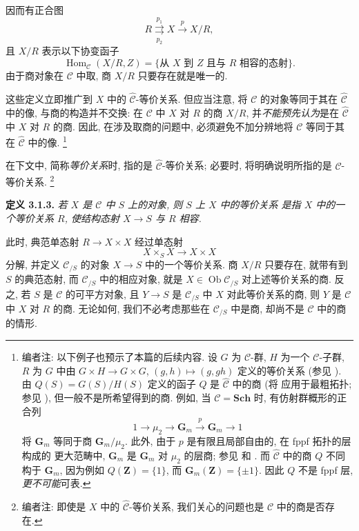 因而有正合图
\[
  R\overset{p_1}{\underset{p_2}{\rightrightarrows}}
  X\xrightarrow{p}X/R,
\]
且 \(X/R\) 表示以下协变函子
\[
  \operatorname{Hom}_{\mathscr C}(X/R,Z)
  =\{\text{从 \(X\) 到 \(Z\) 且与 \(R\) 相容的态射}\}.
\]
由于商对象在 \(\mathscr C\) 中取, 商 \(X/R\) 只要存在就是唯一的.

这些定义立即推广到 \(X\) 中的 \(\widehat{\mathscr C}\)-等价关系.
但应当注意, 将 \(\mathscr C\) 的对象等同于其在
\(\widehat{\mathscr C}\) 中的像, 与商的构造并不交换:
在 \(\mathscr C\) 中 \(X\) 对 \(R\) 的商 \(X/R\),
并\emph{不能预先认为}是在 \(\widehat{\mathscr C}\) 中
\(X\) 对 \(R\) 的商. 因此, 在涉及取商的问题中,
必须避免不加分辨地将 \(\mathscr C\) 等同于其在
\(\widehat{\mathscr C}\) 中的像.
\footnote{编者注: 以下例子也预示了本篇的后续内容.
设 \(G\) 为 \(\mathscr C\)-群, \(H\) 为一个
\(\mathscr C\)-子群, \(R\) 为 \(G\) 中由
\(G\times H\to G\times G\), \((g,h)\mapsto(g,gh)\)
定义的等价关系 (参见 ).
由 \(Q(S)=G(S)/H(S)\) 定义的函子 \(Q\) 是
\(\widehat{\mathscr C}\) 中的商
(将  应用于最粗拓扑;
参见 ),
但一般不是所希望得到的商. 例如, 当 \(\mathscr C=\mathbf{Sch}\) 时,
有仿射群概形的正合列
\[
  1\longrightarrow\mu_2\longrightarrow\mathbf G_m
  \xrightarrow{p}\mathbf G_m\longrightarrow1
\]
将 \(\mathbf G_m\) 等同于商 \(\mathbf G_m/\mu_2\).
此外, 由于 \(p\) 是有限且局部自由的, 在 fppf 拓扑的层构成的
更大范畴中, \(\mathbf G_m\) 是 \(\mathbf G_m\) 对 \(\mu_2\)
的层商; 参见 
和 .
而 \(\widehat{\mathscr C}\) 中的商 \(Q\) 不同构于 \(\mathbf G_m\),
因为例如 \(Q(\mathbf Z)=\{1\}\), 而
\(\mathbf G_m(\mathbf Z)=\{\pm1\}\). 因此 \(Q\) 不是 fppf 层,
\emph{更不可能}可表.}

在下文中, 简称\emph{等价关系}时, 指的是
\(\widehat{\mathscr C}\)-等价关系; 必要时, 将明确说明所指的是
\(\mathscr C\)-等价关系.
\footnote{编者注: 即使是 \(X\) 中的 \(\widehat{\mathscr C}\)-等价关系,
我们关心的问题也是 \(\mathscr C\) 中的商是否存在.}

\medskip
\noindent{}\textbf{定义 3.1.3.}
\textit{若 \(X\) 是 \(\mathscr C\) 中 \(S\) 上的对象,
则 \emph{\(S\) 上 \(X\) 中的等价关系} 是指 \(X\) 中的一个等价关系
\(R\), 使结构态射 \(X\to S\) 与 \(R\) 相容.}

此时, 典范单态射 \(R\to X\times X\) 经过单态射
\[
  X\times_S X\longrightarrow X\times X
\]
分解, 并定义 \(\mathscr C_{/S}\) 的对象 \(X\to S\) 中的一个等价关系.
商 \(X/R\) 只要存在, 就带有到 \(S\) 的典范态射,
而 \(\mathscr C_{/S}\) 中的相应对象, 就是
\(X\in\operatorname{Ob}\mathscr C_{/S}\) 对上述等价关系的商.
反之, 若 \(S\) 是 \(\mathscr C\) 的可平方对象,
且 \(Y\to S\) 是 \(\mathscr C_{/S}\) 中 \(X\) 对此等价关系的商,
则 \(Y\) 是 \(\mathscr C\) 中 \(X\) 对 \(R\) 的商.
无论如何, 我们不必考虑那些在 \(\mathscr C_{/S}\) 中是商,
却尚不是 \(\mathscr C\) 中的商的情形.

